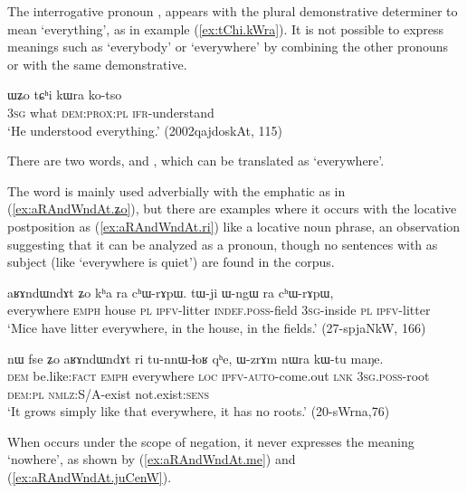 The interrogative pronoun , appears with the plural demonstrative determiner  to mean `everything', as in example (\ref{ex:tChi.kWra}). It is not possible to express meanings such as `everybody' or `everywhere'  by combining the other pronouns  or  with the same demonstrative.

\begin{exe}
\ex \label{ex:tChi.kWra}
\gll ɯʑo tɕʰi kɯra ko-tso \\
\textsc{3sg} what \textsc{dem:prox:pl} \textsc{ifr}-understand \\
\glt `He understood everything.' (2002qajdoskAt, 115)
\end{exe}

There are two words,  and , which can be translated as `everywhere'.

The word  is mainly used adverbially with the emphatic  as in (\ref{ex:aRAndWndAt.ʑo}), but there are examples where it occurs with the locative postposition  as (\ref{ex:aRAndWndAt.ri}) like a locative noun phrase, an observation suggesting that it can be analyzed as a pronoun, though no sentences with  as subject (like `everywhere is quiet') are found in the corpus.

 \begin{exe}
\ex \label{ex:aRAndWndAt.ʑo}
\gll  aʁɤndɯndɤt ʑo kʰa ra cʰɯ-rɤpɯ. tɯ-ji ɯ-ngɯ ra cʰɯ-rɤpɯ, \\
everywhere \textsc{emph} house \textsc{pl} \textsc{ipfv}-litter \textsc{indef.poss}-field \textsc{3sg}-inside \textsc{pl} \textsc{ipfv}-litter \\
\glt `Mice have litter everywhere, in the house, in the fields.' (27-spjaNkW, 166)
\end{exe} 

 \begin{exe}
\ex \label{ex:aRAndWndAt.ri}
\gll nɯ fse ʑo aʁɤndɯndɤt ri tu-nnɯ-ɬoʁ qʰe, ɯ-zrɤm nɯra kɯ-tu maŋe. \\
\textsc{dem} be.like:\textsc{fact} \textsc{emph} everywhere \textsc{loc} \textsc{ipfv}-\textsc{auto}-come.out \textsc{lnk} \textsc{3sg.poss}-root \textsc{dem:pl} \textsc{nmlz}:S/A-exist not.exist:\textsc{sens} \\
\glt `It grows simply like that everywhere, it has no roots.' (20-sWrna,76)
\end{exe} 

When  occurs under the scope of negation, it never expresses the meaning `nowhere', as shown by (\ref{ex:aRAndWndAt.me}) and (\ref{ex:aRAndWndAt.juCenW}).

